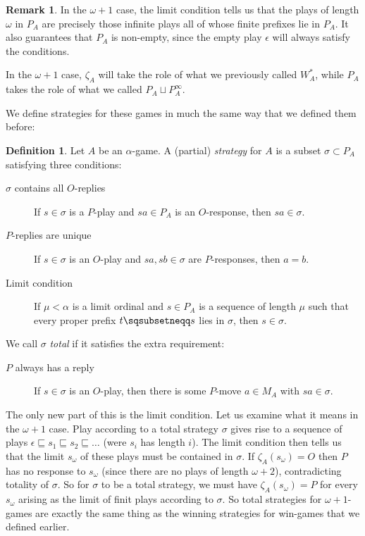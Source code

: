 \documentclass[11pt]{article} %
\theoremstyle{plain} %
\theoremstyle{definition} %
\newtheorem{definition}[theorem]{Definition}
\newtheorem{remark}[theorem]{Remark}
\theoremstyle{note}
\theoremstyle{exercisestyle}
\newcommand{\cprd}{\sqcup}
\newcommand{\emptyplay}{\epsilon}
\newcommand{\prefix}{\sqsubseteq}
\newcommand{\pprefix}{\sqsubsetneqq}
\begin{document}
\begin{remark}
  In the $\omega+1$ case, the limit condition tells us that the plays of length $\omega$ in $P_A$ are precisely those infinite plays all of whose finite prefixes lie in $P_A$.  It also guarantees that $P_A$ is non-empty, since the empty play $\emptyplay$ will always satisfy the conditions.

  In the $\omega+1$ case, $\zeta_A$ will take the role of what we previously called $W_A^*$, while $P_A$ takes the role of what we called $P_A\cprd P_A^\infty$.  
\end{remark}

We define strategies for these games in much the same way that we defined them before:

\begin{definition}
  Let $A$ be an $\alpha$-game.  A (partial) \emph{strategy} for $A$ is a subset $\sigma\subset P_A$ satisfying three conditions:
  \begin{description}
    \item[$\sigma$ contains all $O$-replies] If $s\in\sigma$ is a $P$-play and $sa\in P_A$ is an $O$-response, then $sa\in\sigma$.
    \item[$P$-replies are unique] If $s\in\sigma$ is an $O$-play and $sa,sb\in\sigma$ are $P$-responses, then $a=b$.
    \item[Limit condition] If $\mu<\alpha$ is a limit ordinal and $s\in P_A$ is a sequence of length $\mu$ such that every proper prefix $t\pprefix s$ lies in $\sigma$, then $s\in\sigma$.
  \end{description}

  We call $\sigma$ \emph{total} if it satisfies the extra requirement:

  \begin{description}
    \item[$P$ always has a reply] If $s\in\sigma$ is an $O$-play, then there is some $P$-move $a\in M_A$ with $sa\in\sigma$.
  \end{description}
\end{definition}

The only new part of this is the limit condition.  Let us examine what it means in the $\omega+1$ case.  Play according to a total strategy $\sigma$ gives rise to a sequence of plays $\emptyplay \prefix s_1\prefix s_2\prefix\dots$ (were $s_i$ has length $i$).  The limit condition then tells us that the limit $s_\omega$ of these plays must be contained in $\sigma$.  If $\zeta_A(s_\omega)=O$ then $P$ has no response to $s_\omega$ (since there are no plays of length $\omega+2$), contradicting totality of $\sigma$.  So for $\sigma$ to be a total strategy, we must have $\zeta_A(s_\omega)=P$ for every $s_\omega$ arising as the limit of finit plays according to $\sigma$.  So total strategies for $\omega+1$-games are exactly the same thing as the winning strategies for win-games that we defined earlier.  
\end{document}
